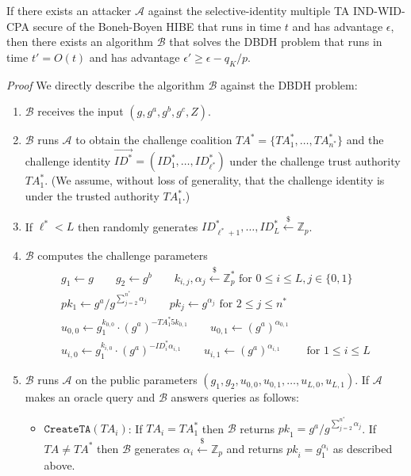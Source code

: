 \documentclass[10pt]{llncs}
\newcommand{\A}{\mathcal{A}}
\newcommand{\B}{\mathcal{B}}
\newcommand{\Zbb}{\mathbb{Z}}
\newcommand{\ID}{\mathit{ID}}
\newcommand{\TA}{\mathit{TA}}
\newcommand{\pk}{\mathit{pk}}
\newcommand{\getsr}{\stackrel{{\scriptscriptstyle\$}}{\gets}}
\begin{document}
\begin{theorem}
If there exists an attacker $\A$ against the selective-identity multiple TA IND-WID-CPA secure of the Boneh-Boyen HIBE that runs in time $t$ and has advantage $\epsilon$, then there exists an algorithm $\B$ that solves the DBDH problem that runs in time $t'=O(t)$ and has advantage $\epsilon' \geq \epsilon -q_{K}/p$.
\end{theorem}
\emph{Proof} We directly describe the algorithm $\B$ against the DBDH problem:
\begin{enumerate}
\item $\B$ receives the input $(g,g^{a},g^{b},g^{c},Z)$.
\item $\B$ runs $\A$ to obtain the challenge coalition $\TA^{*}=\{\TA^{*}_{1},\ldots,\TA^{*}_{n^{*}}\}$ and the challenge identity $\vec{\ID^{*}}=(\ID^{*}_{1},\ldots,\ID^{*}_{\ell^{*}})$ under the challenge trust authority $\TA^{*}_{1}$. (We assume, without loss of generality, that the challenge identity is under the trusted authority $\TA^{*}_{1}$.)
\item If $\ell^{*} < L$ then randomly generates $\ID^{*}_{\ell^{*}+1},\ldots,\ID^{*}_{L}\getsr \Zbb_{p}$.
\item $\B$ computes the challenge parameters
	\begin{displaymath}
	\begin{array}{c}
	g_{1} \gets g \qquad g_{2}\gets g^{b} \qquad k_{i,j}, \alpha_{j} \getsr \Zbb_{p}^{*} \mbox{ for } 0\leq i\leq L, j\in \{0,1\}\\
	pk_1 \gets g^{a}/g^{\sum_{j=2}^{n^{*}} \alpha_{j}} \qquad pk_j \gets g^{\alpha_{j}} \mbox{ for } 2\leq j\leq n^{*}\\
	u_{0,0} \gets g_{1}^{k_{0,0}}\cdot (g^{a})^{-\TA^{*}_{1}5k_{0,1}} \qquad u_{0,1} \gets (g^{a})^{\alpha_{0,1}}\\
	u_{i,0} \gets g_{1}^{k_{i,0}}\cdot (g^{a})^{-\ID^{*}_{i}\alpha_{i,1}} \qquad u_{i,1} \gets (g^{a})^{\alpha_{i,1}} \qquad \mbox{ for } 1\leq i\leq L
	\end{array}
	\end{displaymath}
\item $\B$ runs $\A$ on the public parameters $(g_{1},g_{2},u_{0,0},u_{0,1},\ldots,u_{L,0},u_{L,1})$. If $\A$ makes an oracle query and $\B$ answers queries as follows:
	\begin{itemize}
	\item $\texttt{CreateTA}(\TA_i)$: If $\TA_i = \TA^{*}_1$ then $\B$ returns $\pk_1 = g^{a}/g^{\sum_{j=2}^{n^{*}} \alpha_{j}}$. If $\TA \neq \TA^{*}$ then $\B$ generates $\alpha_i \getsr \Zbb_{p}$ and returns $\pk_i = g_{1}^{\alpha_i}$ as described above.

\end{itemize}
\end{enumerate}
\end{document}
